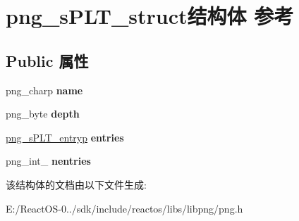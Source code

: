 \hypertarget{structpng__s_p_l_t__struct}{}\section{png\+\_\+s\+P\+L\+T\+\_\+struct结构体 参考}
\label{structpng__s_p_l_t__struct}
\subsection*{Public 属性}
\begin{DoxyCompactItemize}
\item 
\mbox{\label{structpng__s_p_l_t__struct_af3b088b149e790b9b98ebedde69a70f0}} 
png\+\_\+charp {\bfseries name}
\item 
\mbox{\label{structpng__s_p_l_t__struct_a6e667882cd16c9675455cebd49898b22}} 
png\+\_\+byte {\bfseries depth}
\item 
\mbox{\label{structpng__s_p_l_t__struct_a4c7db13fb1a7f0ede434e174b20151ec}} 
\hyperlink{structpng__s_p_l_t__entry__struct}{png\+\_\+s\+P\+L\+T\+\_\+entryp} {\bfseries entries}
\item 
\mbox{\label{structpng__s_p_l_t__struct_ac5844e98e4c43733bad6b83b54dc7a9f}} 
png\+\_\+int\+\_ {\bfseries nentries}
\end{DoxyCompactItemize}


该结构体的文档由以下文件生成\+:\begin{DoxyCompactItemize}
\item 
E\+:/\+React\+O\+S-\/0../sdk/include/reactos/libs/libpng/png.\+h\end{DoxyCompactItemize}
